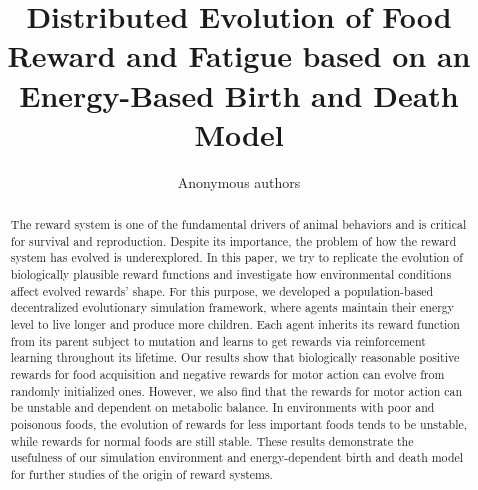 \documentclass[letterpaper]{article}
\title{Distributed Evolution of Food Reward and Fatigue based on an Energy-Based Birth and Death Model}
\author{
  Anonymous authors
} %
\newcommand{\1}{\mathbb{I} } %
\newcounter{num}
\begin{document}
\maketitle

\begin{abstract}
  The reward system is one of the fundamental drivers of animal behaviors and is critical for survival and reproduction. Despite its importance, the problem of how the reward system has evolved is underexplored. In this paper, we try to replicate the evolution of biologically plausible reward functions and investigate how environmental conditions affect evolved rewards' shape. For this purpose, we developed a population-based decentralized evolutionary simulation framework, where agents maintain their energy level to live longer and produce more children. Each agent inherits its reward function from its parent subject to mutation and learns to get rewards via reinforcement learning throughout its lifetime. Our results show that biologically reasonable positive rewards for food acquisition and negative rewards for motor action can evolve from randomly initialized ones. However, we also find that the rewards for motor action can be unstable and dependent on metabolic balance. In environments with poor and poisonous foods, the evolution of rewards for less important foods tends to be unstable, while rewards for normal foods are still stable. These results demonstrate the usefulness of our simulation environment and energy-dependent birth and death model for further studies of the origin of reward systems.
\end{abstract}




\clearpage




% 
\end{document}
